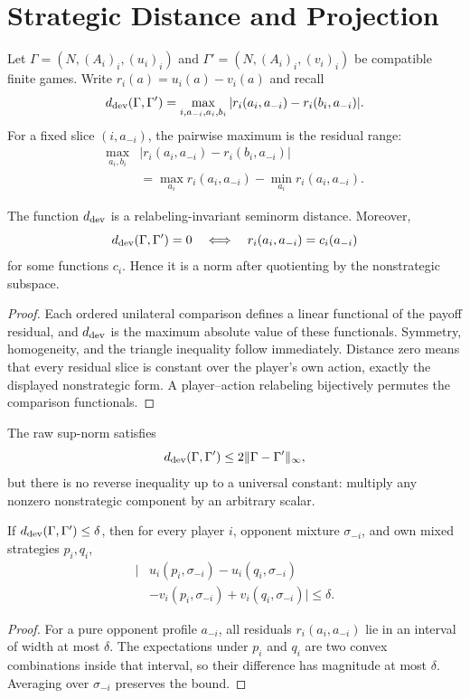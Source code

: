 \section{Strategic Distance and Projection}

Let $\Gamma=(N,(A_i)_i,(u_i)_i)$ and
$\Gamma'=(N,(A_i)_i,(v_i)_i)$ be compatible finite games.  Write
$r_i(a)=u_i(a)-v_i(a)$ and recall
\[
d_{\mathrm{dev}}(\Gamma,\Gamma')
=
\max_{i,a_{-i},a_i,b_i}
|r_i(a_i,a_{-i})-r_i(b_i,a_{-i})|.
\]
For a fixed slice $(i,a_{-i})$, the pairwise maximum is the residual range:
\begin{align}
\max_{a_i,b_i}
&|r_i(a_i,a_{-i})-r_i(b_i,a_{-i})|
\nonumber\\
&=
\max_{a_i}r_i(a_i,a_{-i})-
\min_{a_i}r_i(a_i,a_{-i}).
\label{eq:supp-range}
\end{align}

\begin{lemma}
\label{lem:supp-seminorm}
The function $d_{\mathrm{dev}}$ is a relabeling-invariant seminorm distance.  Moreover,
\[
d_{\mathrm{dev}}(\Gamma,\Gamma')=0
\quad\Longleftrightarrow\quad
r_i(a_i,a_{-i})=c_i(a_{-i})
\]
for some functions $c_i$.  Hence it is a norm after quotienting by the nonstrategic subspace.
\end{lemma}
\begin{proof}
Each ordered unilateral comparison defines a linear functional of the payoff residual, and $d_{\mathrm{dev}}$ is the maximum absolute value of these functionals.  Symmetry, homogeneity, and the triangle inequality follow immediately.  Distance zero means that every residual slice is constant over the player's own action, exactly the displayed nonstrategic form.  A player--action relabeling bijectively permutes the comparison functionals.
\end{proof}

The raw sup-norm satisfies
\begin{equation}
d_{\mathrm{dev}}(\Gamma,\Gamma')
\le 2\|\Gamma-\Gamma'\|_\infty,
\label{eq:supp-raw-upper}
\end{equation}
but there is no reverse inequality up to a universal constant: multiply any nonzero nonstrategic component by an arbitrary scalar.

\begin{lemma}
\label{lem:supp-mixed}
If $d_{\mathrm{dev}}(\Gamma,\Gamma')\le\delta$, then for every player $i$, opponent mixture $\sigma_{-i}$, and own mixed strategies $p_i,q_i$,
\begin{align*}
\Big|&u_i(p_i,\sigma_{-i})-u_i(q_i,\sigma_{-i})\\
&-v_i(p_i,\sigma_{-i})+v_i(q_i,\sigma_{-i})\Big|
\le\delta.
\end{align*}
\end{lemma}
\begin{proof}
For a pure opponent profile $a_{-i}$, all residuals
$r_i(a_i,a_{-i})$ lie in an interval of width at most $\delta$.  The expectations under $p_i$ and $q_i$ are two convex combinations inside that interval, so their difference has magnitude at most $\delta$.  Averaging over $\sigma_{-i}$ preserves the bound.
\end{proof}

